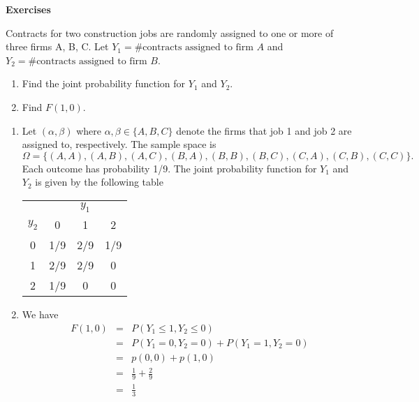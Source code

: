 {\huge \textbf{Exercises}}
\vspace{10pt}
\begin{exercise}{}{}
Contracts for two construction jobs are randomly assigned to one or more of three firms A, B, C. Let $Y_1 = \#\text{contracts assigned to firm }A$ and $Y_2 = \#\text{contracts assigned to firm }B$.
\begin{enumerate}
	\item Find the joint probability function for $Y_1$ and $Y_2$.
	\item Find $F(1,0)$.
\end{enumerate}
\end{exercise}

\begin{solution}
	\begin{enumerate}
		\item Let $(\alpha, \beta)$ where $\alpha, \beta\in \{A, B, C\}$ denote the firms that job 1 and job 2 are assigned to, respectively. The sample space is
		\[\Omega = \{(A,A), (A,B), (A,C), (B,A), (B,B), (B,C), (C, A), (C,B), (C,C)\}.\]
		Each outcome has probability 1/9. The joint probability function for $Y_1$ and $Y_2$ is given by the following table
		\begin{center}
			\begin{tabular}{c | c c c}
				& & $y_1$ &  \\ \cline{2-4}
			  $y_2$ & 0 & 1 & 2 \\ \hline
			  0 & 1/9 & 2/9 & 1/9 \\
			  1 & 2/9 & 2/9 & 0\\
			  2 & 1/9 & 0 & 0
			\end{tabular}
		\end{center}
		\item We have
		\begin{eqnarray*}
			F(1,0) &=& P(Y_{1}\leq 1, Y_{2}\leq 0)\\
			&=& P(Y_1 = 0, Y_2 = 0) + P(Y_1 = 1, Y_2 = 0)\\
			&=& p(0,0) + p(1,0)\\
			&=& \frac{1}{9} + \frac{2}{9}\\
			&=& \frac{1}{3} 
		\end{eqnarray*}
	\end{enumerate}
\end{solution}

